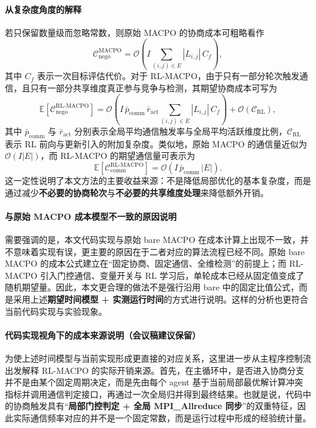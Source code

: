 \documentclass[conference]{IEEEtran}
\begin{document}
\paragraph{从复杂度角度的解释}
若只保留数量级而忽略常数，则原始 MACPO 的协商成本可粗略看作
\[
\mathcal{C}_{\mathrm{nego}}^{\mathrm{MACPO}}
=
\mathcal{O}\!\left(
I\sum_{(i,j)\in E}|L_{i,j}|\,C_f
\right),
\]
其中 $C_f$ 表示一次目标评估代价。对于 RL-MACPO，由于只有一部分轮次触发通信，且只有一部分共享维度真正参与竞争与检测，其期望协商成本可写为
\[
\mathbb{E}\!\left[\mathcal{C}_{\mathrm{nego}}^{\mathrm{RL\mbox{-}MACPO}}\right]
=
\mathcal{O}\!\left(
I\,\bar p_{\mathrm{comm}}\,\bar r_{\mathrm{act}}
\sum_{(i,j)\in E}|L_{i,j}|\,C_f
\right)
+ 
\mathcal{O}(\mathcal{C}_{\mathrm{RL}}),
\]
其中 $\bar p_{\mathrm{comm}}$ 与 $\bar r_{\mathrm{act}}$ 分别表示全局平均通信触发率与全局平均活跃维度比例，$\mathcal{C}_{\mathrm{RL}}$ 表示 RL 前向与更新引入的附加复杂度。类似地，原始 MACPO 的通信量近似为 $\mathcal{O}(I|E|)$，而 RL-MACPO 的期望通信量可表示为
\[
\mathbb{E}[\mathcal{C}_{\mathrm{comm}}^{\mathrm{RL\mbox{-}MACPO}}]
=
\mathcal{O}(I\,\bar p_{\mathrm{comm}}\,|E|).
\]
这一定性说明了本文方法的主要收益来源：不是降低局部优化的基本复杂度，而是通过减少\textbf{不必要的协商轮次}与\textbf{不必要的共享维度处理}来降低额外开销。

\paragraph{与原始 MACPO 成本模型不一致的原因说明}
需要强调的是，本文代码实现与原始 bare MACPO 在成本计算上出现不一致，并不意味着实现有误，更主要的原因在于二者对应的算法流程已经不同。原始 bare MACPO 的成本公式建立在“固定协商、固定通信、全维检测”的前提上；而 RL-MACPO 引入门控通信、变量开关与 RL 学习后，单轮成本已经从固定值变成了随机期望量。因此，本文更合理的做法不是强行沿用 bare 中的固定比值公式，而是采用上述\textbf{期望时间模型 + 实测运行时间}的方式进行说明。这样的分析也更符合当前代码实现与实验现象。


\paragraph{代码实现视角下的成本来源说明（会议稿建议保留）}
为使上述时间模型与当前实现形成更直接的对应关系，这里进一步从主程序控制流出发解释 RL-MACPO 的实际开销来源。首先，在主循环中，是否进入协商分支并不是由某个固定周期决定，而是先由每个 agent 基于当前局部最优解计算冲突指标并调用通信判定接口，再通过一次全局归并得到最终结果。也就是说，代码中的协商触发具有“\textbf{局部门控判定 + 全局 MPI\_Allreduce 同步}”的双重特征，因此实际通信频率对应的并不是一个固定常数，而是运行过程中形成的经验统计量。
\end{document}
